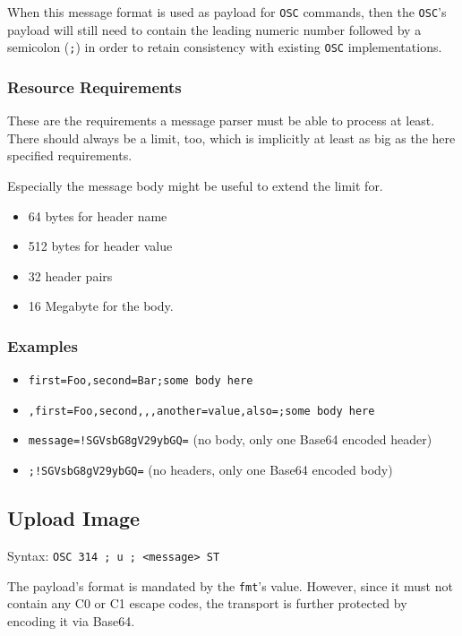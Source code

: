 \documentclass[a4paper]{article}
\newcommand{\code}[1]{\colorbox{light-gray}{\texttt{#1}}}
\begin{document}
When this message format is used as payload for \code{OSC} commands, then
the \code{OSC}'s payload will still need to contain the leading numeric
number followed by a semicolon (\code{;}) in order to retain consistency
with existing \code{OSC} implementations.

\subsubsection*{Resource Requirements}

These are the requirements a message parser must be able to process at least.
There should always be a limit, too, which is implicitly at least as big as
the here specified requirements.

Especially the message body might be useful to extend the limit for.

\begin{itemize}
    \item 64 bytes for header name
    \item 512 bytes for header value
    \item 32 header pairs
    \item 16 Megabyte for the body.
\end{itemize}

\subsubsection*{Examples}

\begin{itemize}
    \item \code{first=Foo,second=Bar;some body here}
    \item \code{,first=Foo,second,,,another=value,also=;some body here}
    \item \code{message=!SGVsbG8gV29ybGQ=} (no body, only one Base64 encoded header)
    \item \code{;!SGVsbG8gV29ybGQ=} (no headers, only one Base64 encoded body)
\end{itemize}

\subsection{Upload Image} %

Syntax: \code{OSC 314 ; u ; <message> ST}

The payload's format is mandated by the \code{fmt}'s value. However, since it must not contain
any C0 or C1 escape codes, the transport is further protected by encoding it via Base64.
\end{document}

